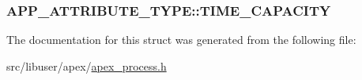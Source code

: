 \subsubsection[{\texorpdfstring{T\+I\+M\+E\+\_\+\+C\+A\+P\+A\+C\+I\+TY}{TIME_CAPACITY}}]{ A\+P\+P\+\_\+\+A\+T\+T\+R\+I\+B\+U\+T\+E\+\_\+\+T\+Y\+P\+E\+::\+T\+I\+M\+E\+\_\+\+C\+A\+P\+A\+C\+I\+TY}\hypertarget{structAPP__ATTRIBUTE__TYPE_ab25da03c2b34897d67cafff51e29a245}{}\label{structAPP__ATTRIBUTE__TYPE_ab25da03c2b34897d67cafff51e29a245}


The documentation for this struct was generated from the following file\+:\begin{DoxyCompactItemize}
\item 
src/libuser/apex/\hyperlink{apex__process_8h}{apex\+\_\+process.\+h}\end{DoxyCompactItemize}
